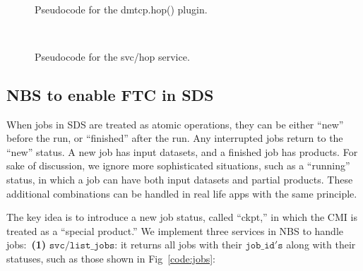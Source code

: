 \documentclass[conference]{IEEEtran}
\begin{document}
\begin{figure}[!ht]
\begin{center}
\begin{center}
\mbox{}\\[0.3em]
\end{center}
\hspace{\fill}%
\caption{Pseudocode for the dmtcp.hop() plugin.}
\label{code:dmtcp_hop}
\end{center}
\end{figure}


\begin{figure}[!ht]
\begin{center}
\begin{center}
\mbox{}\\[0.3em]
\end{center}
\hspace{\fill}%
\caption{Pseudocode for the svc/hop service.}
\label{code:svc_hop}
\end{center}
\end{figure}


\subsection{NBS to enable FTC in SDS}
\label{subsec:s23}

When jobs in SDS are treated as atomic operations, they can be either ``new'' before the run, or ``finished'' after the run. Any interrupted jobs return to the ``new'' status. A new job has input datasets, and a finished job has products. For sake of discussion, we ignore more sophisticated situations, such as a ``running'' status, in which a job can have both input datasets and partial products. These additional combinations can be handled in real life apps with the same principle.

The key idea is to introduce a new job status, called ``ckpt,'' in which the CMI is treated as a ``special product.'' We implement three services in NBS to handle jobs:~\textbf{(1)} $\mathtt{svc/list\_jobs}$: it returns all jobs with their $\mathtt{job\_id's}$ along with their statuses, such as those shown in Fig~\ref{code:jobs}:
\end{document}

